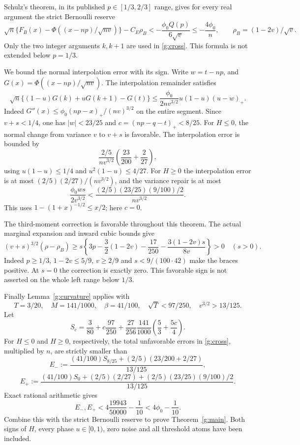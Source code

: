 \documentclass[11pt]{article}
\begin{document}
Schulz's theorem, in its published $p\in[1/3,2/3]$ range, gives for every
real argument the strict Bernoulli reserve
\[
 \sqrt n\{F_B(x)-\Phi((x-np)/\sqrt{nv})\}-C_E\rho_B
 <-\frac{\phi_0Q(p)}{6\sqrt v}\le-\frac{4\phi_0}{n},
 \qquad \rho_B=(1-2v)/\sqrt v.
\]
Only the two integer arguments $k,k+1$ are used in \eqref{g:cross}.
This formula is not extended below $p=1/3$.

We bound the normal interpolation error with its sign. Write $w=t-np$,
and $G(x)=\Phi((x-np)/\sqrt{nv})$. The interpolation remainder satisfies
\[
 \sqrt n\{(1-u)G(k)+uG(k+1)-G(t)\}
 \le\frac{\phi_0}{2nv^{3/2}}u(1-u)(u-w)_+.
\]
Indeed $G''(x)\le\phi_0(np-x)_+/(nv)^{3/2}$ on the entire segment.
Since $v+s<1/4$, one has $|w|<23/25$ and
$c=(np-q-t)_+<8/25$. For $H\le0$, the normal change from variance $v$ to
$v+s$ is favorable. The interpolation error is bounded by
\[
 \frac{2/5}{nv^{3/2}}\left(\frac{23}{200}+\frac2{27}\right),
\]
using $u(1-u)\le1/4$ and $u^2(1-u)\le4/27$.
For $H\ge0$ the interpolation error is at most
$(2/5)(2/27)/(nv^{3/2})$, and the variance repair is at most
\[
 \frac{\phi_0ws}{2v^{3/2}}
             <\frac{(2/5)(23/25)(9/100)/2}{nv^{3/2}}.
\]
This uses $1-(1+x)^{-1/2}\le x/2$; here $c=0$.

The third-moment correction is favorable throughout this theorem.
The actual marginal expansion and inward cubic bounds give
\[
 (v+s)^{3/2}(\rho-\rho_B)
 \ge s\left\{3p-\frac32(1-2v)-\frac{17}{250}
                           -\frac{3(1-2v)s}{8v}\right\}>0
 \quad(s>0).
\]
Indeed $p\ge1/3$, $1-2v\le5/9$, $v\ge2/9$ and
$s<9/(100\cdot42)$ make the braces positive. At $s=0$ the correction
is exactly zero. This favorable sign is not asserted on the whole left
range below $1/3$.

Finally Lemma~\ref{g:curvature} applies with
\[
 T=3/20,\quad M=141/1000,\quad\beta=41/100,\quad
 \sqrt T<97/250,\quad v^{3/2}>13/125.
\]
Let
\[
 S_c=\frac{3}{80}+c\frac{97}{250}
          +\frac{27}{256}\frac{141}{1000}\left(\frac53+\frac{5c}4\right).
\]
For $H\le0$ and $H\ge0$, respectively, the total unfavorable errors
in \eqref{g:cross}, multiplied by $n$, are strictly smaller than
\[
 E_-:=\frac{(41/100)S_{8/25}+(2/5)(23/200+2/27)}{13/125},
\]
\[
 E_+:=\frac{(41/100)S_0+(2/5)(2/27)+(2/5)(23/25)(9/100)/2}{13/125}.
\]
Exact rational arithmetic gives
\[
              E_-,E_+<4\frac{19943}{50000}-\frac1{10}
                         <4\phi_0-\frac1{10}.
\]
Combine this with the strict Bernoulli reserve to prove Theorem~\ref{g:main}.
Both signs of $H$, every phase $u\in[0,1)$, zero noise and all threshold
atoms have been included.
\end{document}
